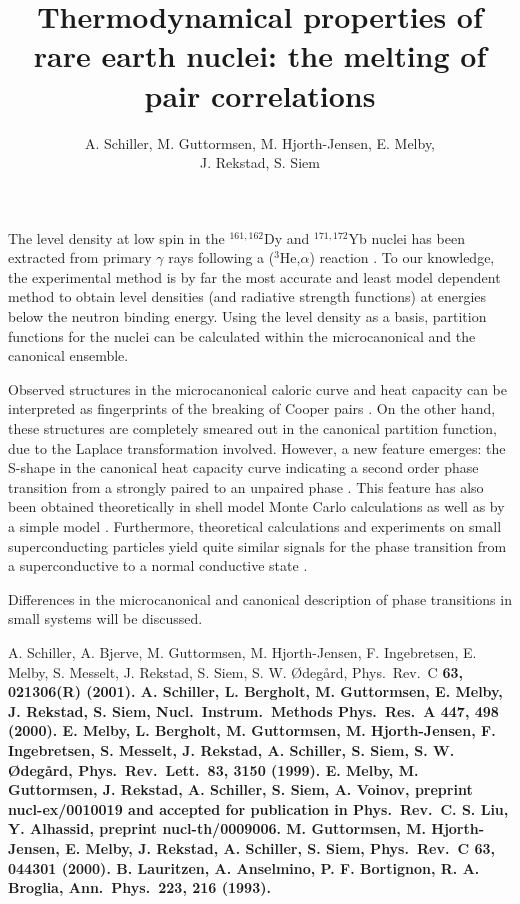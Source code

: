 \documentclass[12pt]{article}
\title{Thermodynamical properties of rare earth nuclei: the melting of pair 
correlations}
\author{A. Schiller\footnotemark[1] \footnotemark[2],
M. Guttormsen\footnotemark[2], M. Hjorth-Jensen\footnotemark[2],
E. Melby\footnotemark[2],\\ 
J. Rekstad\footnotemark[2], S. Siem\footnotemark[2]}
\date{}
\begin{document}
\maketitle


The level density at low spin in the $^{161,162}$Dy and $^{171,172}$Yb nuclei
has been extracted from primary $\gamma$ rays following a ($^3$He,$\alpha$) 
reaction \cite{SB01}. To our knowledge, the experimental method \cite{SB00} is 
by far the most accurate and least model dependent method to obtain level 
densities (and radiative strength functions) at energies below the neutron 
binding energy. Using the level density as a basis, partition functions for the
nuclei can be calculated within the microcanonical and the canonical ensemble.

Observed structures in the microcanonical caloric curve and heat capacity can
be interpreted as fingerprints of the breaking of Cooper pairs 
\cite{MB99,MG01}. On the other hand, these structures are completely smeared
out in the canonical partition function, due to the Laplace transformation
involved. However, a new feature emerges: the S-shape in the canonical heat
capacity curve indicating a second order phase transition from a strongly 
paired to an unpaired phase \cite{SB01}. This feature has also been obtained
theoretically in shell model Monte Carlo calculations \cite{LA00} as well as by
a simple model \cite{GH01}. Furthermore, theoretical calculations and 
experiments on small superconducting particles yield quite similar signals for
the phase transition from a superconductive to a normal conductive state
\cite{LA93}.

Differences in the microcanonical and canonical description of phase 
transitions in small systems will be discussed.

\begin{thebibliography}{99}
A. Schiller, A. Bjerve, M. Guttormsen, M. Hjorth-Jensen, F.
Ingebretsen, E. Melby, S. Messelt, J. Rekstad, S. Siem, S. W. {\O}deg{\aa}rd,
Phys.\ Rev.\ C \bf 63\rm, 021306(R) (2001).  
A. Schiller, L. Bergholt, M. Guttormsen, E. Melby, J. Rekstad, S.
Siem, Nucl.\ Instrum.\ Methods Phys.\ Res.\ A \bf 447\rm, 498 (2000).
E. Melby, L. Bergholt, M. Guttormsen, M. Hjorth-Jensen, F.
Ingebretsen, S. Messelt, J. Rekstad, A. Schiller, S. Siem, S. W. 
{\O}deg{\aa}rd, Phys.\ Rev.\ Lett.\ \bf 83\rm, 3150 (1999).
E. Melby, M. Guttormsen, J. Rekstad, A. Schiller, S. Siem, A.
Voinov, preprint nucl-ex/0010019 and accepted for publication in Phys.\ Rev.\ 
C. 
S. Liu, Y. Alhassid, preprint nucl-th/0009006.
M. Guttormsen, M. Hjorth-Jensen, E. Melby, J. Rekstad, 
A. Schiller, S. Siem, Phys.\ Rev.\ C \bf 63\rm, 044301 (2000).
B. Lauritzen, A. Anselmino, P. F. Bortignon, R. A. Broglia, Ann.\
Phys.\ \bf 223\rm, 216 (1993).
\end{thebibliography}
\end{document}
